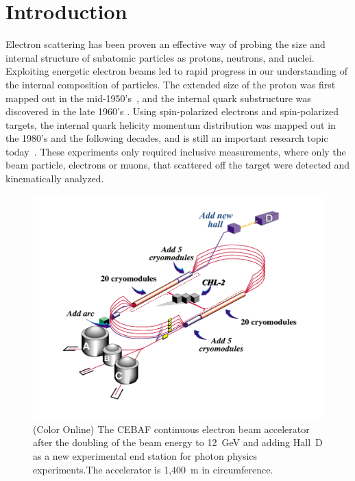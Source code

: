 \documentclass[final,3p,twocolumn]{elsarticle}
\begin{document}
\nolinenumbers
\section{Introduction}

Electron scattering has been proven an effective way of probing the size and internal structure of subatomic
particles as protons, neutrons, and nuclei. Exploiting energetic electron beams led to rapid progress in our
understanding of the internal composition of particles. The extended size of the proton was first mapped out in
the mid-1950's~\cite{Mcallister:1956ng}, and the internal quark substructure was discovered in the late 1960's
\cite{Breidenbach:1969kd}. Using spin-polarized electrons and spin-polarized targets, the internal quark helicity
momentum distribution was mapped out in the 1980's and the following decades, and is still an important research
topic today~\cite{Kuhn:2008sy}. These experiments only required inclusive measurements, where only the beam
particle, electrons or muons, that scattered off the target were detected and kinematically analyzed.  

\begin{figure}[ht]
\centerline{\includegraphics[width=1.8\columnwidth]{cebaf.pdf}}
\caption{ (Color Online) The CEBAF continuous electron beam accelerator after the doubling of the beam energy to 12~GeV and 
adding Hall~D as a new experimental end station for photon physics experiments.The accelerator is 1,400~m in
circumference.}
\label{cebaf12}
\end{figure} 
\end{document}

